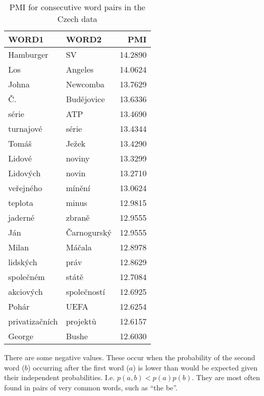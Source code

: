 \documentclass[a4paper]{article}
\begin{document}
    \begin{table}[h!]
        \centering
        \caption{PMI for consecutive word pairs in the Czech data}
        \label{tab:cons_cz}
        \begin{tabular}{llr}
        \toprule
                  WORD1 &        WORD2 &      PMI \\
        \midrule
              Hamburger &           SV &  14.2890 \\
                    Los &      Angeles &  14.0624 \\
                  Johna &     Newcomba &  13.7629 \\
                     Č. &   Budějovice &  13.6336 \\
                  série &          ATP &  13.4690 \\
              turnajové &        série &  13.4344 \\
                  Tomáš &        Ježek &  13.4290 \\
                 Lidové &       noviny &  13.3299 \\
               Lidových &        novin &  13.2710 \\
              veřejného &       mínění &  13.0624 \\
                teplota &        minus &  12.9815 \\
                jaderné &       zbraně &  12.9555 \\
                    Ján &  Čarnogurský &  12.9555 \\
                  Milan &       Máčala &  12.8978 \\
               lidských &         práv &  12.8629 \\
              společném &        státě &  12.7084 \\
              akciových &  společností &  12.6925 \\
                  Pohár &         UEFA &  12.6254 \\
         privatizačních &     projektů &  12.6157 \\
                 George &        Bushe &  12.6030 \\
        \bottomrule
        \end{tabular}
    \end{table}

	There are some negative values. These occur when the probability of the
	second word ($b$) occurring after the first word ($a$) is lower than would
	be expected given their independent probabilities. I.e. $p(a,b) < p(a)p(b)$.
	They are most often found in pairs of very common words, such as ``the be''. 
\end{document}
